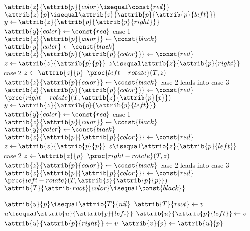 \documentclass{article}
\begin{document}
\begin{codebox}
\li \While $\attrib{z}{\attrib{p}{color} \isequal \const{red}}$
    \Do
\li     \If $\attrib{z}{p} \isequal \attrib{z}{\attrib{p}{\attrib{p}{left}}}$
\li     \Then
            $y \gets{\attrib{z}{\attrib{p}{\attrib{p}{right}}}}$
\li         \If $\attrib{y}{color} \gets{\const{red}}$ \Comment case 1
\li         \Then
                $\attrib{z}{\attrib{p}{color}} \gets{\const{black}}$
\li             $\attrib{y}{color} \gets{\const{black}}$
\li             $\attrib{z}{\attrib{p}{\attrib{p}{color}}} \gets{\const{red}}$
\li             $z \gets{\attrib{z}{\attrib{p}{p}}}$
\li         \Else
\li             \If $z \isequal \attrib{z}{\attrib{p}{right}}$ \Comment case 2
\li             \Then
                    $z \gets{\attrib{z}{p}}$
\li                 $\proc{left-rotate}(T, z)$
                \End
\li             $\attrib{z}{\attrib{p}{color}}
\gets{\const{black}}$ \Comment case 2 leads into case 3
\li             $\attrib{z}{\attrib{p}{\attrib{p}{color}}} \gets{\const{red}}$
\li             $\proc{right-rotate}(T, \attrib{z}{\attrib{p}{p}})$
            \End
\li     \Else
\li         $y \gets{\attrib{z}{\attrib{p}{\attrib{p}{left}}}}$
\li         \If $\attrib{y}{color} \gets{\const{red}}$ \Comment case 1
\li         \Then
                $\attrib{z}{\attrib{p}{color}} \gets{\const{black}}$
\li             $\attrib{y}{color} \gets{\const{black}}$
\li             $\attrib{z}{\attrib{p}{\attrib{p}{color}}} \gets{\const{red}}$
\li             $z \gets{\attrib{z}{\attrib{p}{p}}}$
\li         \Else
\li             \If $z \isequal \attrib{z}{\attrib{p}{left}}$ \Comment case 2
\li             \Then
                    $z \gets{\attrib{z}{p}}$
\li                 $\proc{right-rotate}(T, z)$
                \End
\li             $\attrib{z}{\attrib{p}{color}} \gets{\const{black}}$ \Comment case 2 leads into case 3
\li             $\attrib{z}{\attrib{p}{\attrib{p}{color}}} \gets{\const{red}}$
\li             $\proc{left-rotate}(T, \attrib{z}{\attrib{p}{p}})$
            \End
        \End
    \End
\li $\attrib{T}{\attrib{root}{color} \isequal \const{black}}$
\end{codebox}

\begin{codebox}
\li \If $\attrib{u}{p} \isequal \attrib{T}{nil}$
\li \Then
        $\attrib{T}{root} \gets{v}$
\li \ElseIf $u \isequal \attrib{u}{\attrib{p}{left}}$
\li \Then
        $\attrib{u}{\attrib{p}{left}} \gets{v}$
\li \Else
\li     $\attrib{u}{\attrib{p}{right}} \gets{v}$
    \End
\li $\attrib{v}{p} \gets{\attrib{u}{p}}$
\end{codebox}
\end{document}
